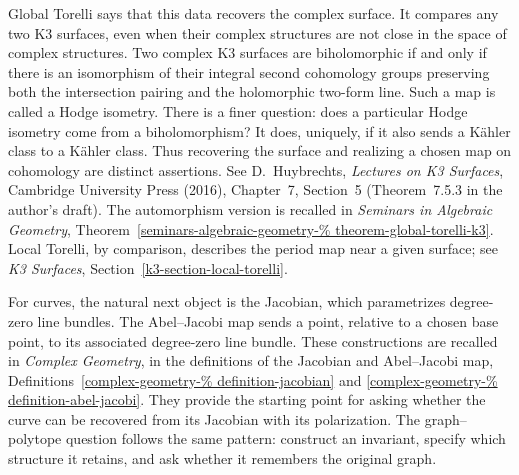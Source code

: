 Global Torelli says that this data
recovers the complex surface. It compares
any two K3 surfaces, even when their
complex structures are not close in
the space of complex structures.
Two complex K3 surfaces are
biholomorphic if and only if there is an
isomorphism of their integral second
cohomology groups preserving both the
intersection pairing and the holomorphic
two-form line. Such a map is called a
Hodge isometry. There is a finer question:
does a particular Hodge isometry come
from a biholomorphism? It does, uniquely,
if it also sends a K\"ahler class to a
K\"ahler class. Thus recovering the
surface and realizing a chosen map on
cohomology are distinct assertions.
See D.~Huybrechts,
{\it Lectures on K3 Surfaces},
Cambridge University Press (2016),
Chapter~7, Section~5
(Theorem~7.5.3 in the author's draft).
The automorphism version is recalled in
{\it Seminars in Algebraic Geometry},
Theorem~\ref{seminars-algebraic-geometry-%
theorem-global-torelli-k3}.
Local Torelli, by comparison, describes
the period map near a given surface;
see {\it K3 Surfaces},
Section~\ref{k3-section-local-torelli}.

For curves, the natural next object is
the Jacobian, which parametrizes
degree-zero line bundles.
The Abel--Jacobi map sends a point,
relative to a chosen base point, to
its associated degree-zero line bundle.
These constructions are recalled in
{\it Complex Geometry}, in the
definitions of the Jacobian and
Abel--Jacobi map,
Definitions~\ref{complex-geometry-%
definition-jacobian} and
\ref{complex-geometry-%
definition-abel-jacobi}.
They provide the starting point for
asking whether the curve can be recovered
from its Jacobian with its polarization.
The graph--polytope question follows the
same pattern: construct an invariant,
specify which structure it retains,
and ask whether it remembers the
original graph.


